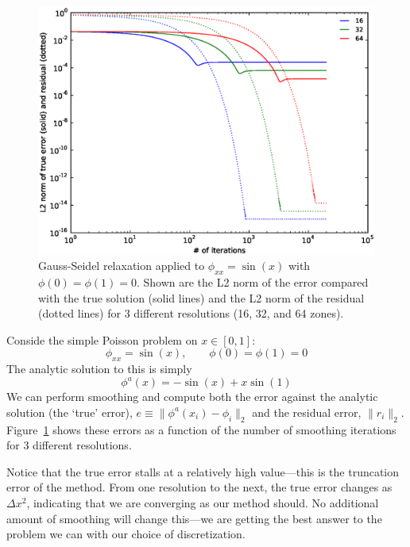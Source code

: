 \begin{figure}
\centering
\includegraphics[width=\linewidth]{smooth-error.eps}
\caption[Convergence as a function of number of iterations using Gauss-Seidel relaxation.]{\label{fig:smootherror} Gauss-Seidel relaxation applied to
  $\phi_{xx} = \sin(x)$ with $\phi(0) = \phi(1) = 0$.  Shown are the
  L2 norm of the error compared with the true solution (solid lines)
  and the L2 norm of the residual (dotted lines) for 3 different
  resolutions (16, 32, and 64 zones).}
\end{figure}

Conside the simple Poisson problem on $x \in [0,1]$:
\begin{equation}
\phi_{xx} = \sin(x), \qquad \phi(0) = \phi(1) = 0
\end{equation}
The analytic solution to this is simply 
\begin{equation}
\phi^a(x) = -\sin(x) + x \sin(1)
\end{equation}
We can perform smoothing and compute both the error against the
analytic solution (the `true' error), $e \equiv \| \phi^a(x_i) - \phi_i \|_2$ and the
residual error, $\| r_i \|_2$.  Figure~\ref{fig:smootherror} shows these
errors as a function of the number of smoothing iterations for 3
different resolutions.

Notice that the true error stalls at a relatively high value---this is
the truncation error of the method.  From one resolution to the next,
the true error changes as $\Delta x^2$, indicating that we are
converging as our method should.  No additional amount of smoothing
will change this---we are getting the best answer to the problem we
can with our choice of discretization.

